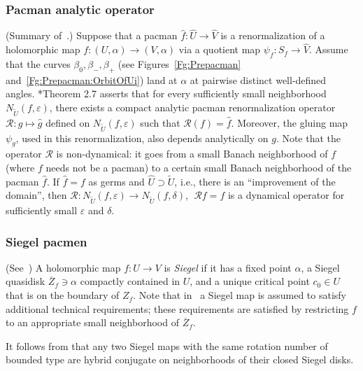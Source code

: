 \documentclass{amsart}
\renewcommand{\sp}{{\ \ }}
\newcommand{\1}{{\mathbb 1 }}
\newcommand\RR{\mathcal{R}}
\theoremstyle{remark}
\numberwithin{equation}{section}
\theoremstyle{definition}
\theoremstyle{nonumberbreak}
\begin{document}
\subsubsection{Pacman analytic operator}\label{sss:RenOperat} (Summary of~\cite[\S 2.5]{DLS}.)
Suppose that a pacman $\hat f:\widehat U\to  \widehat V $ is a renormalization of a holomorphic map $f\colon (U,\alpha)\to   (V,\alpha)$ via a quotient map  $\psi_f:S_f\to \widehat V$. Assume that the curves $\beta_0, \beta_-,  \beta_+$ (see Figures~\ref{Fg:Prepacman} and~\ref{Fg:Prepacman:OrbitOfUi}) land at $\alpha$ at pairwise distinct well-defined angles. \cite{DLS}*{Theorem 2.7} asserts that for every sufficiently small neighborhood $N_{\widetilde U}(f,\varepsilon)$, 
there exists a compact analytic pacman renormalization operator $\mathcal{R}\colon g \mapsto \hat g$ defined on $  N_{\widetilde U}(f,\varepsilon) $ such that $\mathcal{R}(f)=\hat{f}$. Moreover, the gluing map $\psi_g$, used in this renormalization, also depends analytically on $g$. Note that the operator $\RR$ is non-dynamical: it goes from a small Banach neighborhood of $f$ (where $f$ needs not be a pacman) to a certain small Banach neighborhood of the pacman $\widehat f$. If $\widehat f=f$ as germs and $\widehat U\supset \widetilde U$, i.e., there is an ``improvement of the domain'', then $\RR\colon N_{\widetilde U}(f,\varepsilon) \to N_{\widetilde U}(f,\delta) , \sp \RR f=f$ is a dynamical operator for sufficiently small $\varepsilon$ and $\delta$. 






\subsubsection{Siegel pacmen}
\label{sss:SiegPacmen}
(See~\cite[\S3]{DLS}) A holomorphic map $f\colon U\to V$ is  \emph{Siegel} if it has a fixed point $\alpha$, a Siegel quasidisk $\overline Z_f\ni \alpha$ compactly contained in $U$, and a unique critical point $c_0\in U$ that is on the boundary of $ Z_f$. Note that in~\cite{AL-posmeas} a Siegel map is assumed to satisfy additional technical requirements; these requirements are satisfied by restricting $f$ to an appropriate small neighborhood of $\overline Z_f$. 

It follows from \cite[Theorem 3.19, Proposition 4.3]{AL-posmeas} that any two Siegel maps with the same rotation number of bounded type are hybrid conjugate on neighborhoods of their closed Siegel disks.
\end{document}
